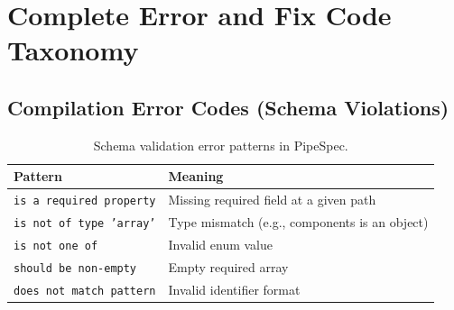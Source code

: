 \documentclass[11pt,a4paper]{article}
\theoremstyle{definition}
\begin{document}
\section{Complete Error and Fix Code Taxonomy}

\subsection{Compilation Error Codes (Schema Violations)}
\begin{table}[htbp]
\centering
\caption{Schema validation error patterns in PipeSpec.}
\begin{tabular}{@{}ll@{}}
\toprule
\textbf{Pattern} & \textbf{Meaning} \\
\midrule
\texttt{is a required property} & Missing required field at a given path \\
\texttt{is not of type 'array'} & Type mismatch (e.g., components is an object) \\
\texttt{is not one of}         & Invalid enum value \\
\texttt{should be non-empty}   & Empty required array \\
\texttt{does not match pattern}& Invalid identifier format \\
\bottomrule
\end{tabular}
\end{table}
\end{document}

